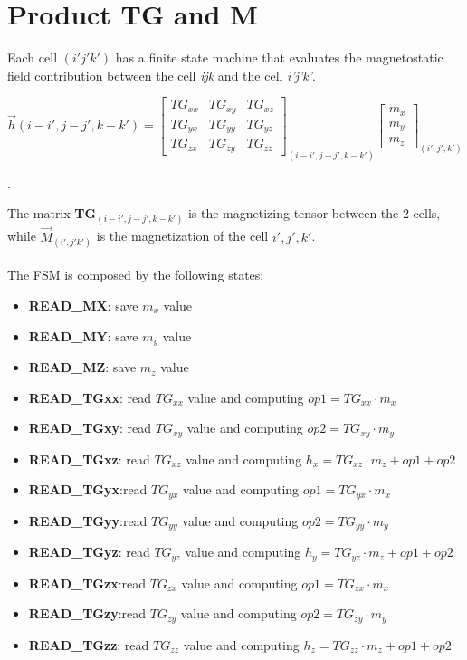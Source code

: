   \section{Product TG and M}
  Each cell $ (i'j'k') $ has a finite state machine that evaluates the magnetostatic field contribution between the cell \textit{ijk} and the cell \textit{i'j'k'}.
  \begin{center}
  		$ \overrightarrow{h}(i-i',j-j',k-k')= \begin{bmatrix}
  	TG_{xx} & TG_{xy} & TG_{xz}\\
  	TG_{yx} & TG_{yy}& TG_{yz}    	\\
  	TG_{zx}&TG_{zy} & TG_{zz}  
  	\end{bmatrix}_{(i-i',j-j',k-k')}\begin{bmatrix}
  	m_{x}\\
  	m_{y}\\
  	m_{z}\end{bmatrix}_{(i',j',k')}$
  \end{center}.
  
  The matrix \textbf{TG}$ _{(i-i',j-j',k-k')} $ is the magnetizing tensor between the 2 cells, while $ \overrightarrow{M}_{(i',j'k')} $ is the magnetization of the cell $ i',j',k'$.\\\\
  The FSM is composed by the following states:
  \begin{itemize}
  	 \item \textbf{READ\_MX}: save $ m_x $ value
  	 \item \textbf{READ\_MY}: save $ m_y $ value
  	 \item \textbf{READ\_MZ}: save $ m_z $ value
  	 \item \textbf{READ\_TGxx}: read $ TG_{xx} $ value and computing $ op1= TG_{xx}\cdot m_x$
  	 \item \textbf{READ\_TGxy}: read $ TG_{xy} $ value and computing $ op2= TG_{xy}\cdot m_y$
  	 \item \textbf{READ\_TGxz}: read $ TG_{xz} $ value and computing $ h_x= TG_{xz}\cdot m_z +op1+op2$
  	 \item \textbf{READ\_TGyx}:read $ TG_{yx} $ value and computing $ op1= TG_{yx}\cdot m_x$
  	 \item \textbf{READ\_TGyy}:read $ TG_{yy} $ value and computing $ op2= TG_{yy}\cdot m_y$
  	 \item \textbf{READ\_TGyz}: read $ TG_{yz} $ value and computing $ h_y= TG_{yz}\cdot m_z +op1+op2$
  	 \item \textbf{READ\_TGzx}:read $ TG_{zx} $ value and computing $ op1= TG_{zx}\cdot m_x$
  	 \item \textbf{READ\_TGzy}:read $ TG_{zy} $ value and computing $ op2= TG_{zy}\cdot m_y$
  	 \item \textbf{READ\_TGzz}: read $ TG_{zz} $ value and computing $ h_z= TG_{zz}\cdot m_z +op1+op2$
  \end{itemize}
   
